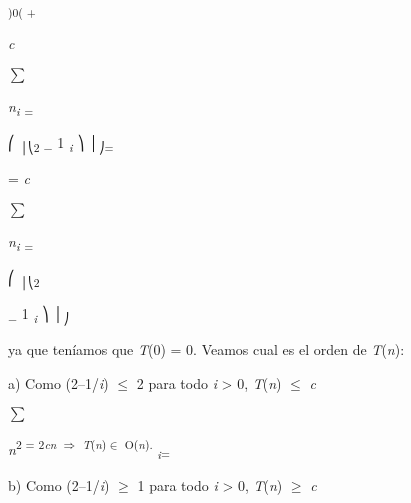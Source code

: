\documentclass[12pt]{article}
\renewcommand{\_}{\kern-1.5pt\textunderscore\kern-1.5pt}
\begin{document}
\textsubscript{)0( + }\par

\textit{c }{\fontsize{18pt}{21.6pt}\selectfont $ \sum $ {\fontsize{7pt}{8.4pt}\selectfont \textit{n\textsubscript{i }}\textsubscript{= }{\fontsize{6pt}{7.2pt} \par}\par}\par}\par

⎛ \textsubscript{│⎝2 $-$  }1 \textit{\textsubscript{i }}⎞ │\textsubscript{⎠= }\par

{\fontsize{10pt}{12.0pt}\selectfont = \textit{c }\par}\par

{\fontsize{18pt}{21.6pt}\selectfont $ \sum $ {\fontsize{7pt}{8.4pt}\selectfont \textit{n\textsubscript{i }}\textsubscript{= }{\fontsize{6pt}{7.2pt} \par}\par}\par}\par

⎛ \textsubscript{│⎝2 }\par

\begin{Center}
\textsubscript{$-$  }1 \textit{\textsubscript{i }}⎞ │\textsubscript{⎠}{\fontsize{10pt}{12.0pt}\selectfont ya que teníamos que \textit{T}(0) = 0. Veamos cual es el orden de \textit{T}(\textit{n}): \par}
\end{Center}\par

{\fontsize{10pt}{12.0pt}\selectfont a) Como (2–1/\textit{i}) $ \leq $  2 para todo \textit{i }> 0, \textit{T}(\textit{n}) $ \leq $  \textit{c }\par}\par

{\fontsize{18pt}{21.6pt}\selectfont $ \sum $ {\fontsize{7pt}{8.4pt}\selectfont \textit{n}\textsuperscript{2 = 2\textit{cn }$ \Rightarrow $  \textit{T}(\textit{n})$ \in $ O(\textit{n}). }\textit{\textsubscript{i}}\textsubscript{=}{\fontsize{6pt}{7.2pt} {\fontsize{10pt}{12.0pt}\selectfont b) Como (2–1/\textit{i}) $ \geq $  1 para todo \textit{i }> 0, \textit{T}(\textit{n}) $ \geq $  \textit{c }\par}\par}\par}\par}\par
\end{document}

